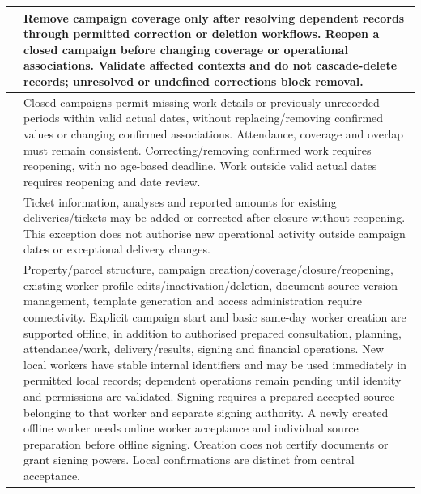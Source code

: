 {\begin{longtable}{L{0.12}L{0.88}}
\midrule
{}\label{br:010}\textbf{} & Remove campaign coverage only after resolving dependent records through permitted correction or deletion workflows. Reopen a closed campaign before changing coverage or operational associations. Validate affected contexts and do not cascade-delete records; unresolved or undefined corrections block removal. \\
\midrule
{}\label{br:011}\textbf{} & Closed campaigns permit missing work details or previously unrecorded periods within valid actual dates, without replacing/removing confirmed values or changing confirmed associations. Attendance, coverage and overlap must remain consistent. Correcting/removing confirmed work requires reopening, with no age-based deadline. Work outside valid actual dates requires reopening and date review. \\
\midrule
{}\label{br:012}\textbf{} & Ticket information, analyses and reported amounts for existing deliveries/tickets may be added or corrected after closure without reopening. This exception does not authorise new operational activity outside campaign dates or exceptional delivery changes. \\
\midrule
{}\label{br:013}\textbf{} & Property/parcel structure, campaign creation/coverage/closure/reopening, existing worker-profile edits/inactivation/deletion, document source-version management, template generation and access administration require connectivity. Explicit campaign start and basic same-day worker creation are supported offline, in addition to authorised prepared consultation, planning, attendance/work, delivery/results, signing and financial operations. New local workers have stable internal identifiers and may be used immediately in permitted local records; dependent operations remain pending until identity and permissions are validated. Signing requires a prepared accepted source belonging to that worker and separate signing authority. A newly created offline worker needs online worker acceptance and individual source preparation before offline signing. Creation does not certify documents or grant signing powers. Local confirmations are distinct from central acceptance. \\


\end{longtable}}
